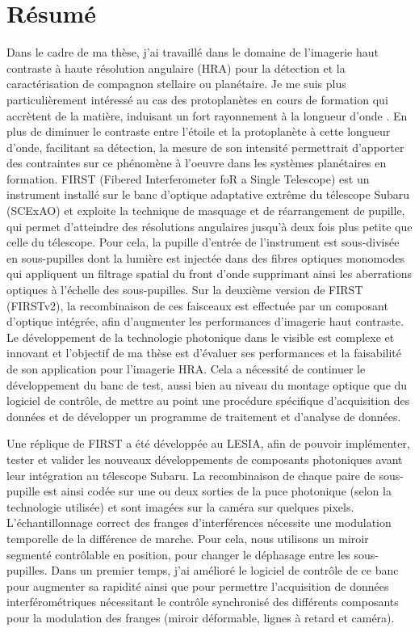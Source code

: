 
\newpage
\thispagestyle{empty}
\chapter*{Résumé}

Dans le cadre de ma thèse, j'ai travaillé dans le domaine de l'imagerie haut contraste à haute résolution angulaire (HRA) pour la détection et la caractérisation de compagnon stellaire ou planétaire. Je me suis plus particulièrement intéressé au cas des protoplanètes en cours de formation qui accrètent de la matière, induisant un fort rayonnement à la longueur d'onde \ha. En plus de diminuer le contraste entre l'étoile et la protoplanète à cette longueur d'onde, facilitant sa détection, la mesure de son intensité permettrait d'apporter des contraintes sur ce phénomène à l'oeuvre dans les systèmes planétaires en formation. FIRST (Fibered Interferometer foR a Single Telescope) est un instrument installé sur le banc d'optique adaptative extrême du télescope Subaru (SCExAO) et exploite la technique de masquage et de réarrangement de pupille, qui permet d'atteindre des résolutions angulaires jusqu'à deux fois plus petite que celle du télescope. Pour cela, la pupille d'entrée de l'instrument est sous-divisée en sous-pupilles dont la lumière est injectée dans des fibres optiques monomodes qui appliquent un filtrage spatial du front d'onde supprimant ainsi les aberrations optiques à l'échelle des sous-pupilles. Sur la deuxième version de FIRST (FIRSTv2), la recombinaison de ces faisceaux est effectuée par un composant d'optique intégrée, afin d'augmenter les performances d'imagerie haut contraste. Le développement de la technologie photonique dans le visible est complexe et innovant et l'objectif de ma thèse est d'évaluer ses performances et la faisabilité de son application pour l'imagerie HRA. Cela a nécessité de continuer le développement du banc de test, aussi bien au niveau du montage optique que du logiciel de contrôle, de mettre au point une procédure spécifique d'acquisition des données et de développer un programme de traitement et d'analyse de données.

Une réplique de FIRST a été développée au \ac{LESIA}, afin de pouvoir implémenter, tester et valider les nouveaux développements de composants photoniques avant leur intégration au télescope Subaru. La recombinaison de chaque paire de sous-pupille est ainsi codée sur une ou deux sorties de la puce photonique (selon la technologie utilisée) et sont imagées sur la caméra sur quelques pixels. L'échantillonnage correct des franges d'interférences nécessite une modulation temporelle de la différence de marche. Pour cela, nous utilisons un miroir segmenté contrôlable en position, pour changer le déphasage entre les sous-pupilles. Dans un premier temps, j'ai amélioré le logiciel de contrôle de ce banc pour augmenter sa rapidité ainsi que pour permettre l'acquisition de données interférométriques nécessitant le contrôle synchronisé des différents composants pour la modulation des franges (miroir déformable, lignes à retard et caméra).

